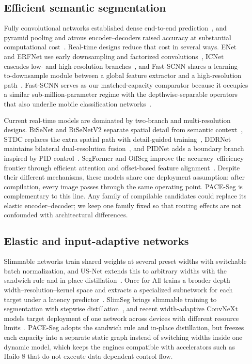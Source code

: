 \documentclass[a4paper,5p]{elsarticle}
\newcommand{\method}{PACE-Seg}
\begin{document}
\subsection{Efficient semantic segmentation}

Fully convolutional networks established dense end-to-end prediction~\cite{long2015fcn}, and pyramid pooling and atrous encoder--decoders raised accuracy at substantial computational cost~\cite{zhao2017pspnet,chen2018deeplabv3plus}. Real-time designs reduce that cost in several ways. ENet and ERFNet use early downsampling and factorized convolutions~\cite{paszke2016enet,romera2018erfnet}, ICNet cascades low- and high-resolution branches~\cite{zhao2018icnet}, and Fast-SCNN shares a learning-to-downsample module between a global feature extractor and a high-resolution path~\cite{poudel2019fastscnn}. Fast-SCNN serves as our matched-capacity comparator because it occupies a similar sub-million-parameter regime with the depthwise-separable operators that also underlie mobile classification networks~\cite{sandler2018mobilenetv2,howard2019mobilenetv3}.

Current real-time models are dominated by two-branch and multi-resolution designs. BiSeNet and BiSeNetV2 separate spatial detail from semantic context~\cite{yu2018bisenet,yu2021bisenetv2}, STDC replaces the extra spatial path with detail-guided training~\cite{fan2021stdc}, DDRNet maintains bilateral dual-resolution fusion~\cite{pan2023ddrnet}, and PIDNet adds a boundary branch inspired by PID control~\cite{xu2023pidnet}. SegFormer and OffSeg improve the accuracy--efficiency frontier through efficient attention and offset-based feature alignment~\cite{xie2021segformer,zhang2025offseg}. Despite their different mechanisms, these models share one deployment assumption: after compilation, every image passes through the same operating point. \method{} is complementary to this line. Any family of compilable candidates could replace its elastic encoder--decoder; we keep one family fixed so that routing effects are not confounded with architectural differences.

\subsection{Elastic and input-adaptive networks}

Slimmable networks train shared weights at several preset widths with switchable batch normalization, and US-Net extends this to arbitrary widths with the sandwich rule and in-place distillation~\cite{yu2019slimmable,yu2019usnet}. Once-for-All trains a broader depth--width--resolution--kernel space and extracts a specialized subnetwork for each target under a latency predictor~\cite{cai2020ofa}. SlimSeg brings slimmable training to segmentation with stepwise distillation~\cite{xue2022slimseg}, and recent width-adaptive ConvNeXt models target deployment of one network across devices with different resource limits~\cite{haberer2026slimmableconvnext}. \method{} adopts the sandwich rule and in-place distillation, but freezes each capacity into a separate static graph instead of switching widths inside one dynamic model, which keeps the engines compatible with accelerators such as Hailo-8 that do not execute data-dependent control flow.
\end{document}
